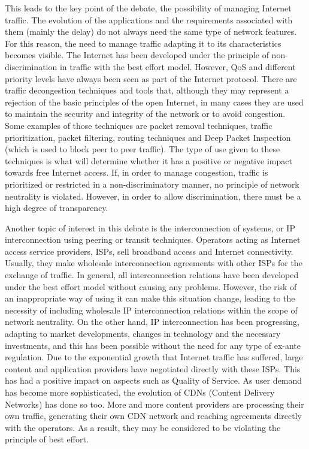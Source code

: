 \documentclass[journal]{IEEEtran}
\begin{document}
This leads to the key point of the debate, the possibility of managing Internet traffic. The evolution of the applications and the requirements associated with them (mainly the delay) do not always need the same type of network features. For this reason, the need to manage traffic adapting it to its characteristics becomes visible. The Internet has been developed under the principle of non-discrimination in traffic with the best effort model. However, QoS and different priority levels have always been seen as part of the Internet protocol. There are traffic decongestion techniques and tools that, although they may represent a rejection of the basic principles of the open Internet, in many cases they are used to maintain the security and integrity of the network or to avoid congestion. Some examples of those techniques are packet removal techniques, traffic prioritization, packet filtering, routing techniques and Deep Packet Inspection (which is used to block peer to peer traffic). The type of use given to these techniques is what will determine whether it has a positive or negative impact towards free Internet access. If, in order to manage congestion, traffic is prioritized or restricted in a non-discriminatory manner, no principle of network neutrality is violated. However, in order to allow discrimination, there must be a high degree of transparency.

Another topic of interest in this debate is the interconnection of systems, or IP interconnection using peering or transit techniques. Operators acting as Internet access service providers, ISPs, sell broadband access and Internet connectivity. Usually, they make wholesale interconnection agreements with other ISPs for the exchange of traffic. In general, all interconnection relations have been developed under the best effort model without causing any problems. However, the risk of an inappropriate way of using it can make this situation change, leading to the necessity of including wholesale IP interconnection relations within the scope of network neutrality. On the other hand, IP interconnection has been progressing, adapting to market developments, changes in technology and the necessary investments, and this has been possible without the need for any type of ex-ante regulation. Due to the exponential growth that Internet traffic has suffered, large content and application providers have negotiated directly with these ISPs. This has had a positive impact on aspects such as Quality of Service. As user demand has become more sophisticated, the evolution of CDNs (Content Delivery Networks) has done so too. More and more content providers are processing their own traffic, generating their own CDN network and reaching agreements directly with the operators. As a result, they may be considered to be violating the principle of best effort.
\end{document}
